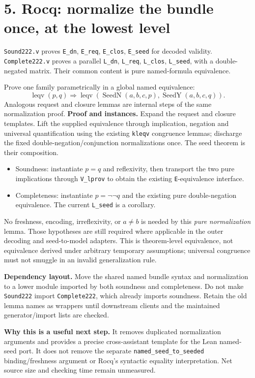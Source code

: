\documentclass[10pt]{article}
\newcommand{\code}[1]{\texttt{#1}}
\begin{document}
\section*{5. Rocq: normalize the bundle once, at the lowest level}
\code{Sound222.v} proves \code{E\_dn}, \code{E\_req}, \code{E\_clos}, \code{E\_seed} for decoded validity. \code{Complete222.v} proves a parallel \code{L\_dn}, \code{L\_req}, \code{L\_clos}, \code{L\_seed}, with a double-negated matrix. Their common content is pure named-formula equivalence.

Prove one family parametrically in a global named equivalence:
\[
\operatorname{leqv}(p,q)\Longrightarrow
\operatorname{leqv}(\operatorname{SeedN}(a,b,c,p),
                    \operatorname{SeedY}(a,b,c,q)).
\]
Analogous request and closure lemmas are internal steps of the same normalization proof.
\newpage
\textbf{Proof and instances.} Expand the request and closure templates. Lift the supplied equivalence through implication, negation and universal quantification using the existing \code{kleqv} congruence lemmas; discharge the fixed double-negation/conjunction normalizations once. The seed theorem is their composition.
\begin{itemize}
\item Soundness: instantiate $p=q$ and reflexivity, then transport the two pure implications through \code{V\_lprov} to obtain the existing \code{E}-equivalence interface.
\item Completeness: instantiate $p=\neg\neg q$ and the existing pure double-negation equivalence. The current \code{L\_seed} is a corollary.
\end{itemize}
No freshness, encoding, irreflexivity, or $a\ne b$ is needed by this \emph{pure normalization} lemma. Those hypotheses are still required where applicable in the outer decoding and seed-to-model adapters. This is theorem-level equivalence, not equivalence derived under arbitrary temporary assumptions; universal congruence must not smuggle in an invalid generalization rule.

\textbf{Dependency layout.} Move the shared named bundle syntax and normalization to a lower module imported by both soundness and completeness. Do not make \code{Sound222} import \code{Complete222}, which already imports soundness. Retain the old lemma names as wrappers until downstream clients and the maintained generator/import lists are checked.

\textbf{Why this is a useful next step.} It removes duplicated normalization arguments and provides a precise cross-assistant template for the Lean named-seed port. It does not remove the separate \code{named\_seed\_to\_seeded} binding/freshness argument or Rocq's syntactic equality interpretation. Net source size and checking time remain unmeasured.
\end{document}
